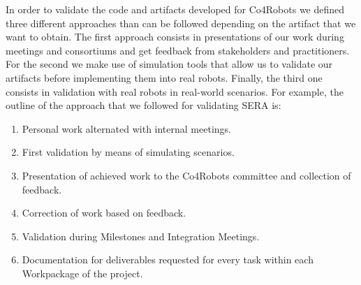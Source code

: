 
In order to validate the code and artifacts developed for Co4Robots we defined three different approaches than can be followed depending on the artifact that we want to obtain.
The first approach consists in presentations of our work during meetings and consortiums and get feedback from stakeholders and practitioners.
For the second we make use of simulation tools that allow us to validate our artifacts before implementing them into real robots.
Finally, the third one consists in validation with real robots in real-world scenarios.
For example, the outline of the approach that we followed for validating SERA is:
\begin{enumerate}
\item Personal work alternated with internal meetings.
\item First validation by means of simulating scenarios.
\item Presentation of achieved work to the Co4Robots committee and collection of feedback.
\item Correction of work based on feedback.
\item Validation during Milestones and Integration Meetings.
\item Documentation for deliverables requested for every task within each Workpackage of the project.
\end{enumerate}



